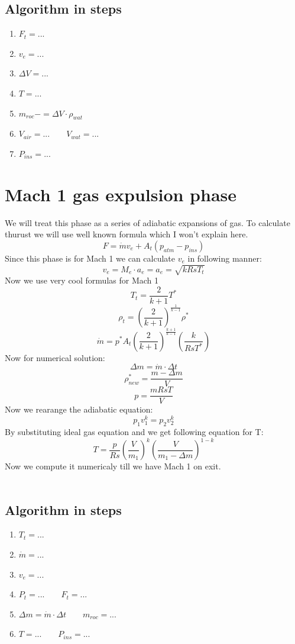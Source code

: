 \documentclass{report}
\begin{document}
\subsection*{Algorithm in steps}
\begin{enumerate}
\item $F_t = ...$
\item $v_e = ...$
\item $\Delta V =...$
\item $T = ...$
\item $m_{roc} -= \Delta V \cdot \rho_{wat}$
\item $ V_{air} = ... \qquad V_{wat} = ...$
\item $P_{ins} = ...$
\end{enumerate}


\section{Mach 1 gas expulsion phase}
We will treat this phase as a series of adiabatic expansions of gas. To calculate thurust we will use well known formula which I won't explain here.
$$F = \dot{m}v_e + A_t(p_{atm} - p_{ins})$$
Since this phase is for Mach 1 we can calculate $v_e$ in following manner:
$$v_e = M_e\cdot a_e = a_e = \sqrt{kRsT_t}$$
Now we use very cool formulas for Mach 1
$$T_t = \frac{2}{k+1}T^*$$
$$\rho_t = \left(\frac{2}{k+1}\right)^{\frac{1}{k-1}}\rho^*$$
$$\dot{m} = p^* A_t\left(\frac{2}{k+1}\right)^{\frac{k+1}{k-1}}\left(\frac{k}{RsT^*}\right)$$
Now for numerical solution:
$$\Delta m = \dot{m} \cdot \Delta t$$
$$\rho^*_{new} = \frac{m-\Delta m}{V}$$
$$p = \frac{mRsT}{V}$$
Now we rearange the adiabatic equation:
$$p_1v_1^k = p_2v_2^k$$ 
By substituting ideal gas equation and we get following equation for T:
$$T = \frac{p}{Rs}\left(\frac{V}{m_1}\right)^k\left(\frac{V}{m_1 - \Delta m}\right)^{1-k}$$
Now we compute it numericaly till we have Mach 1 on exit.\\\\
\subsection*{Algorithm in steps}
\begin{enumerate}
\item $T_t = ...$
\item $\dot{m} = ...$
\item $v_e = ...$
\item $P_t = ...\qquad F_t = ...$
\item $\Delta m = \dot{m}\cdot \Delta t \qquad m_{roc} = ...$
\item $T = ...\qquad P_{ins} = ...$
\end{enumerate}
\end{document}
